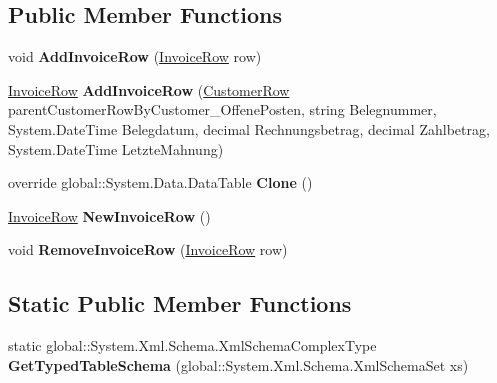 \subsection*{Public Member Functions}
\begin{DoxyCompactItemize}
\item 
void {\bfseries Add\+Invoice\+Row} (\hyperlink{class_products_1_1_data_1_1ds_sage_1_1_invoice_row}{Invoice\+Row} row)\hypertarget{class_products_1_1_data_1_1ds_sage_1_1_invoice_data_table_af9a57f0c039037538a6d8f97d5e015d6}{}\label{class_products_1_1_data_1_1ds_sage_1_1_invoice_data_table_af9a57f0c039037538a6d8f97d5e015d6}

\item 
\hyperlink{class_products_1_1_data_1_1ds_sage_1_1_invoice_row}{Invoice\+Row} {\bfseries Add\+Invoice\+Row} (\hyperlink{class_products_1_1_data_1_1ds_sage_1_1_customer_row}{Customer\+Row} parent\+Customer\+Row\+By\+Customer\+\_\+\+Offene\+Posten, string Belegnummer, System.\+Date\+Time Belegdatum, decimal Rechnungsbetrag, decimal Zahlbetrag, System.\+Date\+Time Letzte\+Mahnung)\hypertarget{class_products_1_1_data_1_1ds_sage_1_1_invoice_data_table_a8dbf1ce10dff4cf79078ca4821003686}{}\label{class_products_1_1_data_1_1ds_sage_1_1_invoice_data_table_a8dbf1ce10dff4cf79078ca4821003686}

\item 
override global\+::\+System.\+Data.\+Data\+Table {\bfseries Clone} ()\hypertarget{class_products_1_1_data_1_1ds_sage_1_1_invoice_data_table_a8b71b1db306a47a583dad363425f1eb8}{}\label{class_products_1_1_data_1_1ds_sage_1_1_invoice_data_table_a8b71b1db306a47a583dad363425f1eb8}

\item 
\hyperlink{class_products_1_1_data_1_1ds_sage_1_1_invoice_row}{Invoice\+Row} {\bfseries New\+Invoice\+Row} ()\hypertarget{class_products_1_1_data_1_1ds_sage_1_1_invoice_data_table_a8d2be5bfffae621b1bf5f0b37ea83beb}{}\label{class_products_1_1_data_1_1ds_sage_1_1_invoice_data_table_a8d2be5bfffae621b1bf5f0b37ea83beb}

\item 
void {\bfseries Remove\+Invoice\+Row} (\hyperlink{class_products_1_1_data_1_1ds_sage_1_1_invoice_row}{Invoice\+Row} row)\hypertarget{class_products_1_1_data_1_1ds_sage_1_1_invoice_data_table_a26c96b254af53e557debe8e62319d316}{}\label{class_products_1_1_data_1_1ds_sage_1_1_invoice_data_table_a26c96b254af53e557debe8e62319d316}

\end{DoxyCompactItemize}
\subsection*{Static Public Member Functions}
\begin{DoxyCompactItemize}
\item 
static global\+::\+System.\+Xml.\+Schema.\+Xml\+Schema\+Complex\+Type {\bfseries Get\+Typed\+Table\+Schema} (global\+::\+System.\+Xml.\+Schema.\+Xml\+Schema\+Set xs)\hypertarget{class_products_1_1_data_1_1ds_sage_1_1_invoice_data_table_a807cd6923c0720e29377c4b1b13d10ac}{}\label{class_products_1_1_data_1_1ds_sage_1_1_invoice_data_table_a807cd6923c0720e29377c4b1b13d10ac}

\end{DoxyCompactItemize}
